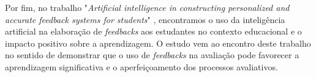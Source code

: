 Por fim, no trabalho "\textit{Artificial intelligence in constructing personalized and accurate feedback systems for students}" \cite{xu2023}, encontramos  o uso da inteligência artificial na elaboração de \textit{feedbacks} aos estudantes no contexto educacional e o impacto positivo sobre a aprendizagem. O estudo vem ao encontro deste trabalho no sentido de demonstrar que o uso de \textit{feedbacks} na avaliação pode favorecer a aprendizagem significativa e o aperfeiçoamento dos processos avaliativos.
